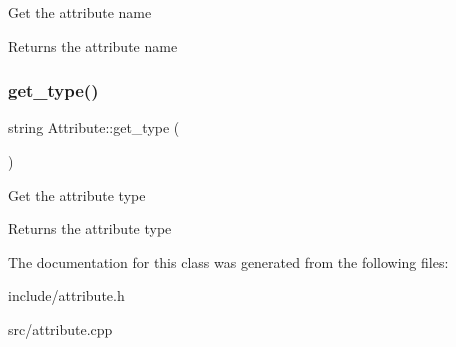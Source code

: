 Get the attribute name \begin{DoxyReturn}{Returns}
the attribute name 
\end{DoxyReturn}
\mbox{\label{classAttribute_a62f47a1d31095cfe3be2903ed89aaf00}} 
\subsubsection{\texorpdfstring{get\+\_\+type()}{get\_type()}}
{\footnotesize\ttfamily string Attribute\+::get\+\_\+type (\begin{DoxyParamCaption}{ }\end{DoxyParamCaption})}

Get the attribute type \begin{DoxyReturn}{Returns}
the attribute type 
\end{DoxyReturn}


The documentation for this class was generated from the following files\+:\begin{DoxyCompactItemize}
\item 
include/attribute.\+h\item 
src/attribute.\+cpp\end{DoxyCompactItemize}
